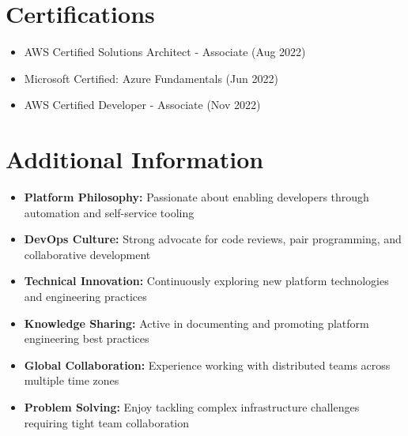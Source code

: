 \documentclass[11pt,a4paper]{article}
\begin{document}
\vspace{6pt}
\section*{Certifications}
\begin{itemize}[noitemsep]
\item AWS Certified Solutions Architect - Associate (Aug 2022)
\item Microsoft Certified: Azure Fundamentals (Jun 2022)
\item AWS Certified Developer - Associate (Nov 2022)
\end{itemize}

\vspace{6pt}
\section*{Additional Information}
\begin{itemize}[noitemsep]
\item \textbf{Platform Philosophy:} Passionate about enabling developers through automation and self-service tooling
\item \textbf{DevOps Culture:} Strong advocate for code reviews, pair programming, and collaborative development
\item \textbf{Technical Innovation:} Continuously exploring new platform technologies and engineering practices
\item \textbf{Knowledge Sharing:} Active in documenting and promoting platform engineering best practices
\item \textbf{Global Collaboration:} Experience working with distributed teams across multiple time zones
\item \textbf{Problem Solving:} Enjoy tackling complex infrastructure challenges requiring tight team collaboration
\end{itemize}
\end{document}
